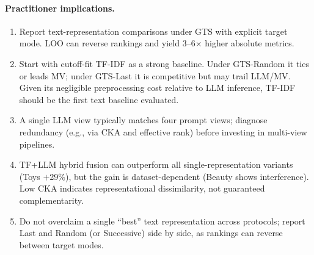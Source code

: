 \documentclass[sigconf,natbib=true,anonymous]{acmart}
\newcommand{\tfidf}{\textsc{TF-IDF}\xspace}
\newcommand{\llm}{\textsc{LLM}\xspace}
\begin{document}
\paragraph{Practitioner implications.}
\begin{enumerate}[leftmargin=*,itemsep=2pt]
\item Report text-representation comparisons under GTS with explicit target mode.  LOO can reverse rankings and yield 3--6$\times$ higher absolute metrics.
\item Start with cutoff-fit \tfidf as a strong baseline.  Under GTS-Random it ties or leads MV; under GTS-Last it is competitive but may trail LLM/MV.  Given its negligible preprocessing cost relative to LLM inference, TF-IDF should be the first text baseline evaluated.
\item A single \llm view typically matches four prompt views; diagnose redundancy (e.g., via CKA and effective rank) before investing in multi-view pipelines.
\item TF+LLM hybrid fusion can outperform all single-representation variants (Toys $+$29\%), but the gain is dataset-dependent (Beauty shows interference).  Low CKA indicates representational dissimilarity, not guaranteed complementarity.
\item Do not overclaim a single ``best'' text representation across protocols; report Last and Random (or Successive) side by side, as rankings can reverse between target modes.
\end{enumerate}
\end{document}
